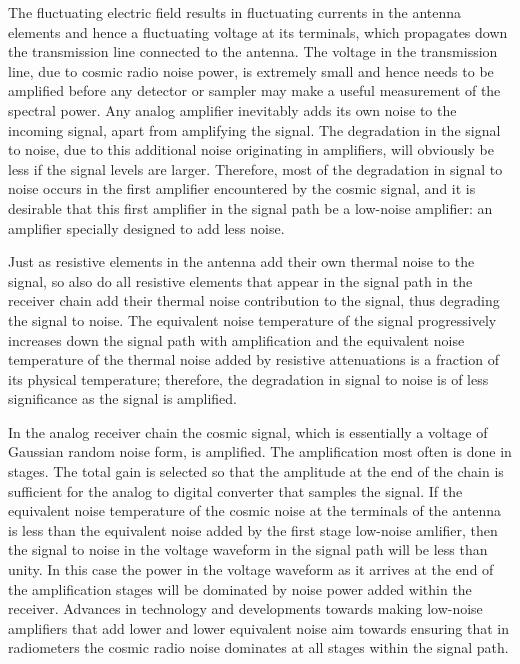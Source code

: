   The fluctuating electric field results in fluctuating currents in the antenna elements and hence a fluctuating voltage at its terminals, which propagates down the transmission line connected to the antenna. The voltage in the transmission line, due to cosmic radio noise power, is extremely small and hence needs to be amplified before any detector or sampler may make a useful measurement of the spectral power.  Any analog amplifier inevitably adds its own noise to the incoming signal, apart from amplifying the signal.  The degradation in the signal to noise, due to this additional noise originating in amplifiers, will obviously be less if the signal levels are larger.  Therefore, most of the degradation in signal to noise occurs in the first amplifier encountered by the cosmic signal, and it is desirable that this first amplifier in the signal path be a low-noise amplifier: an amplifier specially designed to add less noise.  
  
   Just as resistive elements in the antenna add their own thermal noise to the signal, so also do all resistive elements that appear in the signal path in the receiver chain add their thermal noise contribution to the signal, thus degrading the signal to noise.  The equivalent noise temperature of the signal progressively increases down the signal path with amplification and the equivalent noise temperature of the thermal noise added by resistive attenuations is a fraction of its physical temperature; therefore, the degradation in signal to noise is of less significance as the signal is amplified.  
   
   In the analog receiver chain the cosmic signal, which is essentially a voltage of Gaussian random noise form, is amplified.  The amplification most often is done in stages.  The total gain is selected so that the amplitude at the end of the chain is sufficient for the analog to digital converter that samples the signal. If the equivalent noise temperature of the cosmic noise at the terminals of the antenna is less than the equivalent noise added by the first stage low-noise amlifier, then the signal to noise in the voltage waveform in the signal path will be less than unity.  In this case the power in the voltage waveform as it arrives at the end of the amplification stages will be dominated by noise power added within the receiver.  Advances in technology and developments towards making low-noise amplifiers that add lower and lower equivalent noise aim towards ensuring that in radiometers the cosmic radio noise dominates at all stages within the signal path.
   
